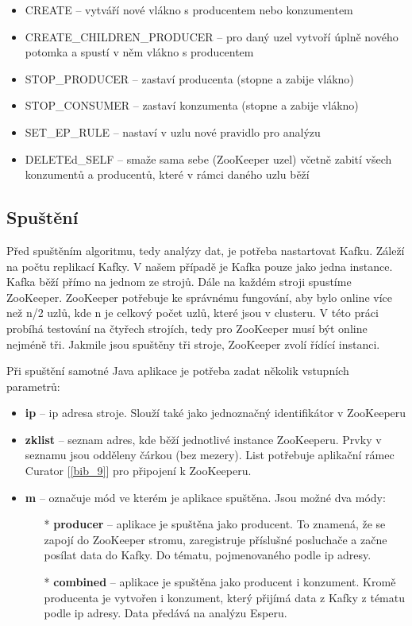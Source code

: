 \documentclass[
  digital, %
  table,   %
  nolof,     %
  nolot,     %
  oneside, %
  nocover,
  monochrome,
  12pt
]{fithesis3}
\begin{document}
\begin{itemize}
  \item CREATE -- vytváří nové vlákno s producentem nebo konzumentem
  \item CREATE\_CHILDREN\_PRODUCER -- pro daný uzel vytvoří úplně nového potomka a spustí v něm vlákno s producentem
  \item STOP\_PRODUCER -- zastaví producenta (stopne a zabije vlákno)
  \item STOP\_CONSUMER -- zastaví konzumenta (stopne a zabije vlákno)
  \item SET\_EP\_RULE -- nastaví v uzlu nové pravidlo pro analýzu
  \item DELETEd\_SELF -- smaže sama sebe (ZooKeeper uzel) včetně zabití všech konzumentů a producentů, které v rámci daného uzlu běží
\end{itemize}

\subsection{Spuštění}
Před spuštěním algoritmu, tedy analýzy dat, je potřeba nastartovat Kafku. Záleží na počtu replikací Kafky. V našem případě je Kafka pouze jako jedna instance. Kafka běží přímo na jednom ze strojů. Dále na každém stroji spustíme ZooKeeper. ZooKeeper potřebuje ke správnému fungování, aby bylo online více než n/2 uzlů, kde n je celkový počet uzlů, které jsou v clusteru. V této práci probíhá testování na čtyřech strojích, tedy pro ZooKeeper musí být online nejméně tři. Jakmile jsou spuštěny tři stroje, ZooKeeper zvolí řídící instanci.

Při spuštění samotné Java aplikace je potřeba zadat několik vstupních parametrů:

\begin{itemize}
  \item \textbf{ip}  -- ip adresa stroje. Slouží také jako jednoznačný identifikátor v ZooKeeperu
  \item \textbf{zklist} -- seznam adres, kde běží jednotlivé instance ZooKeeperu. Prvky v seznamu jsou odděleny čárkou (bez mezery). List potřebuje aplikační rámec Curator [\ref{bib_9}] pro připojení k ZooKeeperu.
  \item \textbf{m} -- označuje mód ve kterém je aplikace spuštěna. Jsou možné dva módy:
  \begin{itemize}
  	\item[*] \textbf{producer} -- aplikace je spuštěna jako producent. To znamená, že se zapojí do ZooKeeper stromu, zaregistruje příslušné posluchače a začne posílat data do Kafky. Do tématu, pojmenovaného podle ip adresy.
  	\item[*] \textbf{combined} -- aplikace je spuštěna jako producent i konzument. Kromě producenta je vytvořen i konzument, který přijímá data z Kafky z tématu podle ip adresy. Data předává na analýzu Esperu.
  \end{itemize}
\end{itemize}
\end{document}
